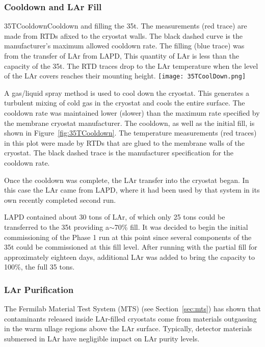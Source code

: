 \subsubsection {Cooldown and LAr Fill}

\begin{cdrfigure}{35TCooldown}{Cooldown and filling the 35t. The 
measurements (red trace) are made from RTDs afixed to the cryostat walls. The black dashed curve is the 
manufacturer's maximum allowed cooldown rate. The filling (blue trace) was from the transfer of LAr 
from LAPD, This quantity of LAr is less than the capacity of the 35t. The RTD traces drop to the LAr 
temperature when the level of the LAr covers reaches their mounting height.}
  \texttt{[image: 35TCoolDown.png]}
\end{cdrfigure}

A gas/liquid spray method is used to cool down the cryostat. This generates a turbulent mixing 
of cold gas in the cryostat and cools the entire surface. The cooldown rate was %
maintained lower (slower) than
the maximum rate specified by the membrane cryostat manufacturer. The cooldown, as well as the initial 
fill, is shown in Figure~\ref{fig:35TCooldown}. The temperature measurements (red traces) in this plot 
were made by RTDs that are glued to the membrane walls of the cryostat. The black dashed trace is the 
manufacturer specification for the cooldown rate.

Once the cooldown was complete, the LAr transfer into the cryostat began. %
In this case the LAr came from LAPD, where it had been used by that system in its own recently completed 
second run\cite{bib:lapdP07005}. 

LAPD contained about 30 tons of LAr, of which only 25 tons could be transferred to the 35t providing a$\sim$70\% fill. It was decided to begin the initial commissioning of the 
Phase 1 run at this point since several components of the 35t could be commissioned at this fill level. After running with the partial fill for approximately eighteen days, additional LAr was 
added to bring the capacity to 100\%, the full 35 tons.

\subsubsection{LAr Purification}

The Fermilab Material Test System (MTS)\cite{bib:Voiron9940,bib:mtslapd308} (see Section~\ref{sec:mts}) has shown that contaminants released inside LAr-filled cryostats come from materials outgassing in the warm ullage regions above the LAr surface. Typically, detector materials submersed in LAr have negligible impact on LAr purity levels. 

